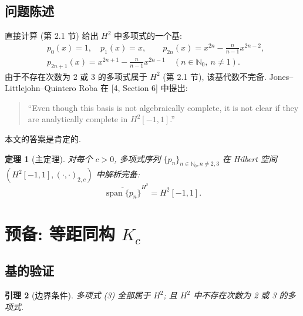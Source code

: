 \documentclass[UTF8]{ctexart}
\newtheorem{theorem}{定理}[section]
\newtheorem{lemma}[theorem]{引理}
\begin{document}
\subsection{问题陈述}

直接计算 (第 2.1 节) 给出 $H^2$ 中多项式的一个基:
\begin{equation}
	\begin{aligned}
		&p_0(x) = 1, \quad p_1(x) = x, \qquad
			p_{2n}(x) = x^{2n} - \tfrac{n}{n-1} x^{2n-2}, \\
		&p_{2n+1}(x) = x^{2n+1} - \tfrac{n}{n-1} x^{2n-1}
			\quad (n \in \mathbb{N}_0,\ n \neq 1).
	\end{aligned}
\end{equation}
由于不存在次数为 2 或 3 的多项式属于 $H^2$ (第 2.1 节), 该基代数不完备.
Jones--Littlejohn--Quintero Roba 在 [4, Section 6] 中提出:

\begin{quote}
``Even though this basis is not algebraically complete, it is not clear if they
are analytically complete in $H^2[-1,1]$.''
\end{quote}

本文的答案是肯定的.

\begin{theorem}[主定理]
对每个 $c > 0$, 多项式序列 $\{p_n\}_{n \in \mathbb{N}_0, n \neq 2,3}$
在 Hilbert 空间 $(H^2[-1,1], (\cdot, \cdot)_{2,c})$ 中解析完备:
\[
	\overline{\operatorname{span}\{ p_n \}}^{H^2} = H^2[-1,1].
\]
\end{theorem}

\section{预备: 等距同构 \texorpdfstring{$K_c$}{Kc}}

\subsection{基的验证}

\begin{lemma}[边界条件]
多项式 (3) 全部属于 $H^2$; 且 $H^2$ 中不存在次数为 2 或 3 的多项式.
\end{lemma}
\end{document}
